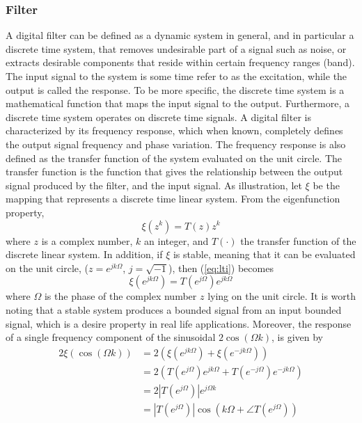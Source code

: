 \documentclass[../Main/thesis.tex]{subfiles}
\begin{document}
\subsubsection{Filter}
A digital filter can be defined as a dynamic system in general, and in particular a discrete time system, that removes undesirable part of a signal such as noise, or extracts desirable components that reside within certain frequency ranges (band). The input signal to the system is some time refer to as the excitation, while the output is called the response. To be more specific, the discrete time system is a mathematical function that maps the input signal to the output. Furthermore, a discrete time system operates on discrete time signals.
\justify
A digital filter is characterized by its frequency response, which when known, completely defines the output signal frequency and phase variation. The frequency response is also defined as the transfer function of the system evaluated on the unit circle. The transfer function is the function that gives the relationship between the output signal produced by the filter, and the input signal.
\justify
As illustration, let $\xi$ be the mapping that represents a discrete time linear system. From the eigenfunction property, 
\begin{equation}\label{eq:lti}
	\xi(z^{k}) = T(z)z^{k}
\end{equation}
where $z$ is a complex number, $k$ an integer, and $T(\cdot)$ the transfer function of the discrete linear system. In addition, if $\xi$ is stable, meaning that it can be evaluated on the unit circle, ($z = e^{jk\Omega}$, $j=\sqrt{-1}$),  then (\ref{eq:lti}) becomes
\begin{equation}\label{eq:lti1}
\xi\left(e^{jk\Omega}\right) = T\left(e^{j\Omega}\right)e^{jk\Omega}
\end{equation}
where $\Omega$ is the phase of the complex number $z$ lying on the unit circle.
It is worth noting that a stable system produces a bounded signal from an input bounded signal, which is a desire property in real life applications. Moreover, the response of a single frequency component of the sinusoidal $ 2\cos(\Omega k)$, is given by
\begin{equation}\label{eq:frs}
	\begin{split}
	2\xi\left(\cos(\Omega k)\right) &= 2\left(\xi\left(e^{jk\Omega}\right) +  \xi\left(e^{-jk\Omega}\right) \right)\\
	&= 2\left( T\left(e^{j\Omega}\right)e^{jk\Omega} + T\left(e^{-j\Omega}\right)e^{-jk\Omega}\right)\\
	&=2|T\left(e^{j\Omega}\right)|e^{j\Omega k}\\
	&=\left\vert T\left(e^{j\Omega}\right)\right\vert\cos\left(k\Omega  + \angle T\left(e^{j\Omega}\right) \right)
	\end{split}
\end{equation}
\end{document}
